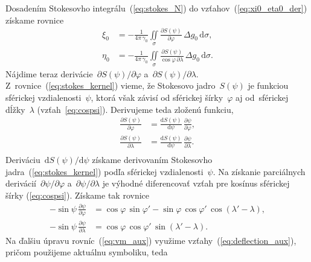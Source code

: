 \documentclass[a4paper, 12pt]{book}
\newcommand{\diff}{\mathrm d}
\begin{document}
Dosadením Stokesovho integrálu~(\ref{eq:stokes_N}) do 
vzťahov~(\ref{eq:xi0_eta0_der}) získame rovnice
%
\begin{equation}
\label{eq:vm}
\begin{split}
\xi_0 &= -\frac{1}{4\pi\,\gamma_0} \iint\limits_\sigma \frac{\partial 
S(\psi)}{\partial \varphi} \, \Delta g_0 \, \diff\sigma{,}\\
\eta_0 &= -\frac{1}{4\pi\,\gamma_0} \iint\limits_\sigma \frac{\partial 
S(\psi)}{\cos\varphi \, \partial \lambda} \, \Delta g_0 \, \diff\sigma{.}
\end{split}
\end{equation}
%
Nájdime teraz derivácie~$\partial S(\psi) \slash \partial\varphi$ a~$\partial 
S(\psi) \slash \partial\lambda$.  Z~rovnice~(\ref{eq:stokes_kernel}) vieme, že 
Stokesovo jadro~$S(\psi)$ je funkciou sférickej vzdialenosti~$\psi$, ktorá však 
závisí od sférickej šírky~$\varphi$ aj od~sférickej dĺžky~$\lambda$ 
(vzťah~\ref{eq:cospsi}).  Derivujeme teda zloženú funkciu,
%
\begin{equation}
\label{eq:stokes_kernel_partials}
\begin{split}
\frac{\partial S(\psi)}{\partial \varphi} &= \frac{\diff S(\psi)}{\diff \psi} 
\, \frac{\partial\psi}{\partial\varphi}{,}\\
%
\frac{\partial S(\psi)}{\partial \lambda} &= \frac{\diff S(\psi)}{\diff \psi} 
\, \frac{\partial\psi}{\partial\lambda}{.}\\
\end{split}
\end{equation}
%
Deriváciu~$\diff S(\psi) \slash \diff \psi$ získame derivovaním Stokesovho 
jadra~(\ref{eq:stokes_kernel}) podľa sférickej vzdialenosti~$\psi$.  Na 
získanie parciálnych derivácií~$\partial\psi \slash \partial\varphi$ 
a~$\partial\psi \slash \partial\lambda$ je výhodné diferencovať vzťah pre 
kosínus sférickej šírky (\ref{eq:cospsi}).  Získame tak rovnice
%
\begin{equation}
\label{eq:vm_aux}
\begin{split}
-\sin\psi \, \frac{\partial \psi}{\partial \varphi} &= \cos\varphi \, 
\sin\varphi' - \sin\varphi \, \cos\varphi' \, \cos(\lambda' - \lambda) {,}\\
-\sin\psi \, \frac{\partial \psi}{\partial \lambda} &= \cos\varphi \, 
\cos\varphi' \, \sin(\lambda' - \lambda){.}
\end{split}
\end{equation}
%
Na ďalšiu úpravu rovníc~(\ref{eq:vm_aux}) využime 
vzťahy~(\ref{eq:deflection_aux}), pričom použijeme aktuálnu symboliku, teda 
\end{document}
